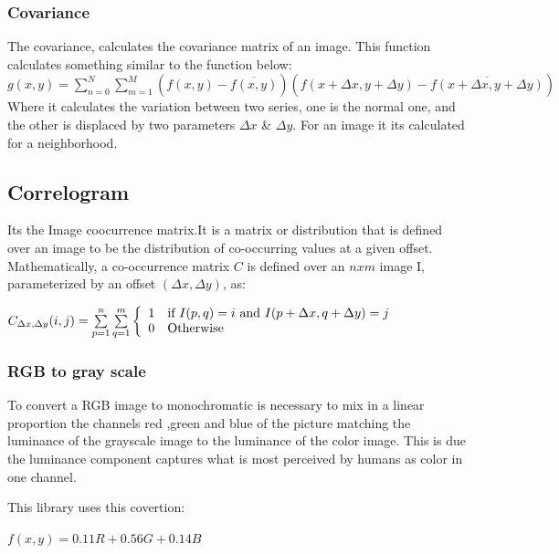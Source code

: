 \documentclass[a4paper]{article}
\begin{document}
\subsubsection{Covariance}

The covariance, calculates the covariance matrix of an image. This function calculates something similar to the function below: \\
\begin{math} 
	g(x,y) = \sum \limits_{n=0}^{N} \sum \limits_{m=1}^M \left( f(x,y) - \overline{f(x,y)}\right)\left(f(x + \Delta x, y + \Delta y) - \overline{f(x + \Delta x, y + \Delta y)} \right)
\end{math}
Where it calculates the variation between two series, one is the normal one, and the other is displaced by two parameters $\Delta x$ \& $\Delta y$. For an image it its calculated for a neighborhood.

\subsection{Correlogram}
Its the Image co\-ocurrence matrix.It is a matrix or distribution that is defined over an image to be the distribution of co-occurring values at a given offset. Mathematically, a co-occurrence matrix $C$ is defined over an $n x m$ image I, parameterized by an offset $(\Delta x,\Delta y)$, as:


\begin{math}
 C_{\Delta x,\Delta y}(i,j) = \sum \limits_{p=1}^{n} \sum \limits_{q=1}^{m} 
 \left\{
	\begin{array}{l l}
		1  & \mbox{if } I(p,q)=i \mbox{  and } I(p+\Delta x,q + \Delta y)= j \\
		0 & \mbox{Otherwise}
	\end{array}\right.
\end{math}
\subsubsection{RGB to gray scale}

To convert a RGB image to monochromatic is necessary to mix in a linear proportion the channels red ,green and blue of the picture matching the luminance of the grayscale image to the luminance of the color image. This is due the luminance component captures what is most perceived by humans as color in one channel.  

This library uses this covertion:

\begin{center}
\begin{math}
f(x,y)= 0.11R+0.56G + 0.14B
\end{math}
\end{center}
\end{document}

